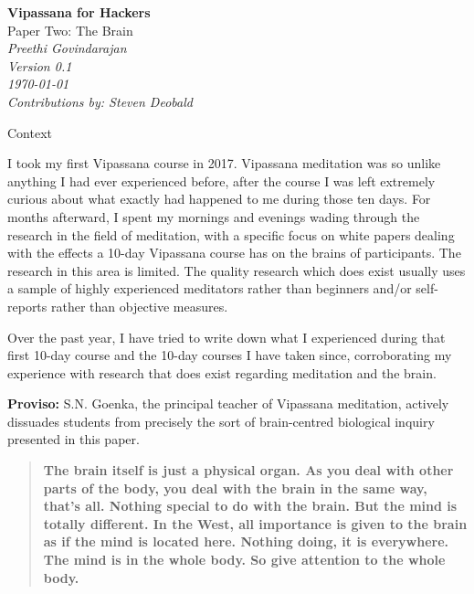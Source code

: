 \documentclass[twocolumn]{article}
\begin{document}
\begin{titlepage}
   \begin{center}
     \Huge\textbf{Vipassana for Hackers}\\
     \Huge{Paper Two: The Brain}\\
     \vspace{5cm}
     \large\textit{Preethi Govindarajan}\\
     \large\textit{Version 0.1}\\
     \large\textit\today\\
     \vspace{5cm}
     \large\textit{Contributions by: Steven Deobald}\\
   \end{center}
\end{titlepage}

\begin{center}
  \Huge{Context}
\end{center}

I took my first Vipassana course in 2017. Vipassana meditation was so unlike anything
I had ever experienced before, after the course I was left extremely curious
about what exactly had happened to me during those ten days. For months afterward, I
spent my mornings and evenings wading through the research in the field of
meditation, with a specific focus on white papers dealing with the effects a
10-day Vipassana course has on the brains of participants. The research in this area
is limited. The quality research which does exist usually uses a sample of highly
experienced meditators rather than beginners and/or self-reports rather than
objective measures.

Over the past year, I have tried to write down what I experienced during that first
10-day course and the 10-day courses I have taken since, corroborating my experience
with research that does exist regarding meditation and the brain.

\textbf{Proviso:} S.N. Goenka, the principal teacher of Vipassana meditation,
actively dissuades students from precisely the sort of brain-centred biological
inquiry presented in this paper.

\begin{quote}
  \textbf{The brain itself is just a physical organ. As you deal with other parts of
    the body, you deal with the brain in the same way, that's all. Nothing special to
    do with the brain. But the mind is totally different. In the West, all importance
    is given to the brain as if the mind is located here. Nothing doing, it is
    everywhere. The mind is in the whole body. So give attention to the whole
    body.} \cite{goenkabrain}
\end{quote}
\end{document}

